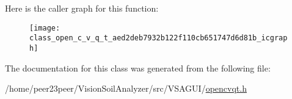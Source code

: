 Here is the caller graph for this function\+:\nopagebreak
\begin{figure}[H]
\begin{center}
\leavevmode
\texttt{[image: class\_open\_c\_v\_q\_t\_aed2deb7932b122f110cb651747d6d81b\_icgraph]}
\end{center}
\end{figure}




The documentation for this class was generated from the following file\+:\begin{DoxyCompactItemize}
\item 
/home/peer23peer/\+Vision\+Soil\+Analyzer/src/\+V\+S\+A\+G\+U\+I/\hyperlink{opencvqt_8h}{opencvqt.\+h}\end{DoxyCompactItemize}
